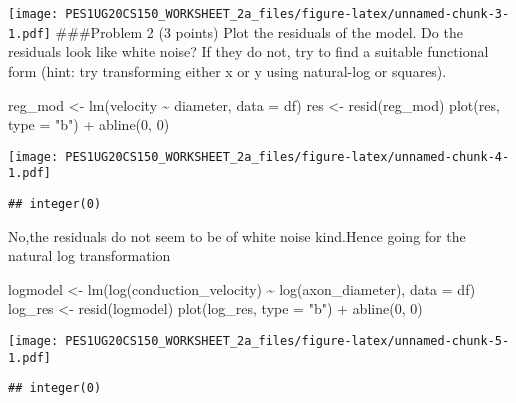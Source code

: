 \documentclass[
]{article}
\newenvironment{Shaded}{\begin{snugshade}}{\end{snugshade}}
\newcommand{\AttributeTok}[1]{\textcolor[rgb]{0.77,0.63,0.00}{#1}}
\newcommand{\DecValTok}[1]{\textcolor[rgb]{0.00,0.00,0.81}{#1}}
\newcommand{\FunctionTok}[1]{\textcolor[rgb]{0.00,0.00,0.00}{#1}}
\newcommand{\NormalTok}[1]{#1}
\newcommand{\OtherTok}[1]{\textcolor[rgb]{0.56,0.35,0.01}{#1}}
\newcommand{\SpecialCharTok}[1]{\textcolor[rgb]{0.00,0.00,0.00}{#1}}
\newcommand{\StringTok}[1]{\textcolor[rgb]{0.31,0.60,0.02}{#1}}
\begin{document}
\texttt{[image: PES1UG20CS150\_WORKSHEET\_2a\_files/figure-latex/unnamed-chunk-3-1.pdf]}
\#\#\#Problem 2 (3 points) Plot the residuals of the model. Do the
residuals look like white noise? If they do not, try to find a suitable
functional form (hint: try transforming either x or y using natural-log
or squares).

\begin{Shaded}
\begin{Highlighting}[]
\NormalTok{reg\_mod }\OtherTok{\textless{}{-}} \FunctionTok{lm}\NormalTok{(velocity }\SpecialCharTok{\textasciitilde{}}\NormalTok{ diameter, }\AttributeTok{data =}\NormalTok{ df)}
\NormalTok{res }\OtherTok{\textless{}{-}} \FunctionTok{resid}\NormalTok{(reg\_mod)}
\FunctionTok{plot}\NormalTok{(res, }\AttributeTok{type =} \StringTok{"b"}\NormalTok{) }\SpecialCharTok{+} \FunctionTok{abline}\NormalTok{(}\DecValTok{0}\NormalTok{, }\DecValTok{0}\NormalTok{)}
\end{Highlighting}
\end{Shaded}

\texttt{[image: PES1UG20CS150\_WORKSHEET\_2a\_files/figure-latex/unnamed-chunk-4-1.pdf]}

\begin{verbatim}
## integer(0)
\end{verbatim}

No,the residuals do not seem to be of white noise kind.Hence going for
the natural log transformation

\begin{Shaded}
\begin{Highlighting}[]
\NormalTok{logmodel }\OtherTok{\textless{}{-}} \FunctionTok{lm}\NormalTok{(}\FunctionTok{log}\NormalTok{(conduction\_velocity) }\SpecialCharTok{\textasciitilde{}} \FunctionTok{log}\NormalTok{(axon\_diameter), }\AttributeTok{data =}\NormalTok{ df)}
\NormalTok{log\_res }\OtherTok{\textless{}{-}} \FunctionTok{resid}\NormalTok{(logmodel)}
\FunctionTok{plot}\NormalTok{(log\_res, }\AttributeTok{type =} \StringTok{"b"}\NormalTok{) }\SpecialCharTok{+} \FunctionTok{abline}\NormalTok{(}\DecValTok{0}\NormalTok{, }\DecValTok{0}\NormalTok{)}
\end{Highlighting}
\end{Shaded}

\texttt{[image: PES1UG20CS150\_WORKSHEET\_2a\_files/figure-latex/unnamed-chunk-5-1.pdf]}

\begin{verbatim}
## integer(0)
\end{verbatim}
\end{document}

